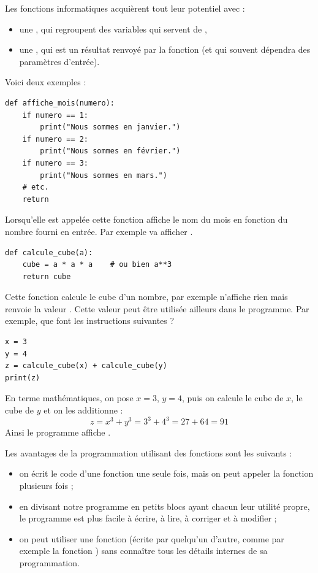 \documentclass[11pt,class=report,crop=false]{standalone}
\begin{document}
\begin{cours}

Les fonctions informatiques acquièrent tout leur potentiel avec :
\begin{itemize}
  \item une , qui regroupent des variables qui servent de ,
  \item une , qui est un résultat renvoyé par la fonction (et qui souvent dépendra des paramètres d'entrée).
\end{itemize}

Voici deux exemples :
\begin{center}
\begin{lstlisting}
def affiche_mois(numero):
    if numero == 1:
        print("Nous sommes en janvier.")
    if numero == 2:
        print("Nous sommes en février.")
    if numero == 3:
        print("Nous sommes en mars.")
    # etc.
    return
\end{lstlisting}
\end{center}
Lorsqu'elle est appelée cette fonction affiche le nom du mois en fonction du nombre fourni en entrée. Par exemple  va afficher .

\begin{center}
\begin{lstlisting}
def calcule_cube(a):
    cube = a * a * a    # ou bien a**3
    return cube
\end{lstlisting}

\end{center}

Cette fonction calcule le cube d'un nombre, par exemple  n'affiche rien mais renvoie la valeur . Cette valeur peut être utilisée ailleurs dans le programme.
Par exemple, que font les instructions suivantes ?
\begin{center}
\begin{lstlisting}
x = 3
y = 4
z = calcule_cube(x) + calcule_cube(y)
print(z)
\end{lstlisting}
\end{center}
En terme mathématiques, on pose $x=3$, $y=4$, puis on calcule le cube de $x$, le cube de $y$ et on les additionne :
$$z = x^3 + y^3 = 3^3 + 4^3 = 27 + 64 = 91$$
Ainsi le programme affiche .

Les avantages de la programmation utilisant des fonctions sont les suivants :
\begin{itemize}
  \item on écrit le code d'une fonction une seule fois, mais on peut appeler la fonction plusieurs fois ;
  \item en divisant notre programme en petits blocs ayant chacun leur utilité propre, le programme est plus facile à écrire, à lire, à corriger et à modifier ;
  \item on peut utiliser une fonction (écrite par quelqu'un d'autre, comme par exemple la fonction ) sans connaître tous les détails internes de sa programmation.
\end{itemize} 


\end{cours}
\end{document}

